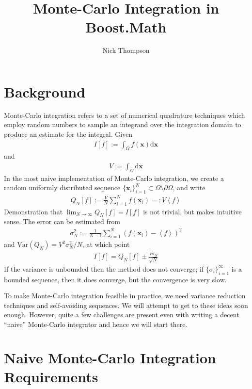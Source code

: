 \documentclass[landscape]{article}
\numberwithin{equation}{section}
\begin{document}
\title{Monte-Carlo Integration in Boost.Math}
\author{Nick Thompson}

\maketitle
\section{Background}

Monte-Carlo integration refers to a set of numerical quadrature techniques which employ random numbers to sample an integrand over the integration domain to produce an estimate for the integral.
Given
\begin{align*}
I[f] := \int_{\Omega} f(\mathbf{x}) \mathrm{d}\mathbf{x}
\end{align*}
and
\begin{align*}
V := \int_{\Omega} \mathrm{d}\mathbf{x}
\end{align*}
In the most naive implementation of Monte-Carlo integration, we create a random uniformly distributed sequence $\{ \mathbf{x}_{i}\}_{i=1}^{N} \subset \Omega \setminus \partial \Omega$, and write
\begin{align*}
Q_{N}[f] := \frac{V}{N} \sum_{i=1}^{N} f(\mathbf{x}_{i}) =: V\left<f \right>
\end{align*}
Demonstration that $\lim_{N\to \infty} Q_{N}[f] = I[f]$ is not trivial, but makes intuitive sense.
The error can be estimated from
\begin{align*}
\sigma_{N}^{2} := \frac{1}{N-1}\sum_{i=1}^{N} (f(\mathbf{x}_{i}) - \left< f \right>)^{2}
\end{align*}
and $\mathrm{Var}(Q_{N}) = V^2\sigma_{N}^{2}/N$, at which point
\begin{align*}
I[f] = Q_{N}[f] \pm \frac{V\sigma_{N}}{\sqrt{N}}
\end{align*}
If the variance is unbounded then the method does not converge; if $\{\sigma_{i}\}_{i=1}^{\infty}$ is a bounded sequence, then it does converge, but the convergence is very slow.

To make Monte-Carlo integration feasible in practice, we need variance reduction techniques and self-avoiding sequences.
We will attempt to get to these ideas soon enough.
However, quite a few challenges are present even with writing a decent ``naive'' Monte-Carlo integrator and hence we will start there.

\section{Naive Monte-Carlo Integration Requirements}
\end{document}
